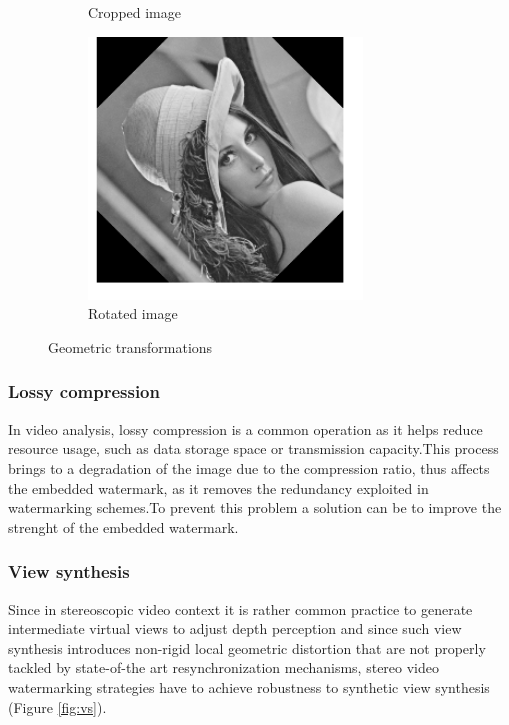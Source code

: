 \begin{figure}[h!]
\begin{subfigure}[]{0.4\textwidth}
\caption{\small{Cropped image}}
\label{fig:geom2}
  \end{subfigure}
\begin{subfigure}[]{0.4\textwidth}
\centering
\includegraphics[width=0.8\textwidth]{./img/rot.png}
\caption{\small{Rotated image}}
\label{fig:geom3}
\end{subfigure}
\caption{\small{Geometric transformations}\label{geom}}
\end{figure}

\subsubsection{Lossy compression}
In video analysis, lossy compression is a common operation as it helps reduce resource usage, such as data storage space or transmission capacity.\newline  This process brings to a degradation of the image due to the compression ratio, thus affects the embedded watermark, as it removes the redundancy exploited in
watermarking schemes.\newline To prevent this problem a solution can be to improve the strenght of the embedded watermark.

\subsubsection{View synthesis}
Since in stereoscopic video context it is rather common practice to generate intermediate virtual views to adjust depth perception and since such view synthesis introduces non-rigid local geometric distortion that are not properly tackled by state-of-the art resynchronization mechanisms, stereo video watermarking strategies have to achieve robustness to synthetic view synthesis (Figure \ref{fig:vs}).\\

